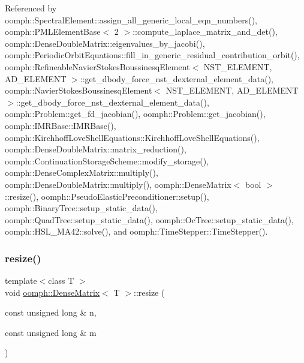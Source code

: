 Referenced by oomph\+::\+Spectral\+Element\+::assign\+\_\+all\+\_\+generic\+\_\+local\+\_\+eqn\+\_\+numbers(), oomph\+::\+P\+M\+L\+Element\+Base$<$ 2 $>$\+::compute\+\_\+laplace\+\_\+matrix\+\_\+and\+\_\+det(), oomph\+::\+Dense\+Double\+Matrix\+::eigenvalues\+\_\+by\+\_\+jacobi(), oomph\+::\+Periodic\+Orbit\+Equations\+::fill\+\_\+in\+\_\+generic\+\_\+residual\+\_\+contribution\+\_\+orbit(), oomph\+::\+Refineable\+Navier\+Stokes\+Boussinesq\+Element$<$ N\+S\+T\+\_\+\+E\+L\+E\+M\+E\+N\+T, A\+D\+\_\+\+E\+L\+E\+M\+E\+N\+T $>$\+::get\+\_\+dbody\+\_\+force\+\_\+nst\+\_\+dexternal\+\_\+element\+\_\+data(), oomph\+::\+Navier\+Stokes\+Boussinesq\+Element$<$ N\+S\+T\+\_\+\+E\+L\+E\+M\+E\+N\+T, A\+D\+\_\+\+E\+L\+E\+M\+E\+N\+T $>$\+::get\+\_\+dbody\+\_\+force\+\_\+nst\+\_\+dexternal\+\_\+element\+\_\+data(), oomph\+::\+Problem\+::get\+\_\+fd\+\_\+jacobian(), oomph\+::\+Problem\+::get\+\_\+jacobian(), oomph\+::\+I\+M\+R\+Base\+::\+I\+M\+R\+Base(), oomph\+::\+Kirchhoff\+Love\+Shell\+Equations\+::\+Kirchhoff\+Love\+Shell\+Equations(), oomph\+::\+Dense\+Double\+Matrix\+::matrix\+\_\+reduction(), oomph\+::\+Continuation\+Storage\+Scheme\+::modify\+\_\+storage(), oomph\+::\+Dense\+Complex\+Matrix\+::multiply(), oomph\+::\+Dense\+Double\+Matrix\+::multiply(), oomph\+::\+Dense\+Matrix$<$ bool $>$\+::resize(), oomph\+::\+Pseudo\+Elastic\+Preconditioner\+::setup(), oomph\+::\+Binary\+Tree\+::setup\+\_\+static\+\_\+data(), oomph\+::\+Quad\+Tree\+::setup\+\_\+static\+\_\+data(), oomph\+::\+Oc\+Tree\+::setup\+\_\+static\+\_\+data(), oomph\+::\+H\+S\+L\+\_\+\+M\+A42\+::solve(), and oomph\+::\+Time\+Stepper\+::\+Time\+Stepper().

\mbox{\label{classoomph_1_1DenseMatrix_a0f01dd97b1c71868371f93259efc26b0}} 
\subsubsection{\texorpdfstring{resize()}{resize()}\hspace{0.1cm}{\footnotesize\ttfamily [2/3]}}
{\footnotesize\ttfamily template$<$class T $>$ \\
void \hyperlink{classoomph_1_1DenseMatrix}{oomph\+::\+Dense\+Matrix}$<$ T $>$\+::resize (\begin{DoxyParamCaption}\item[{const unsigned long \&}]{n,  }\item[{const unsigned long \&}]{m }\end{DoxyParamCaption})}



